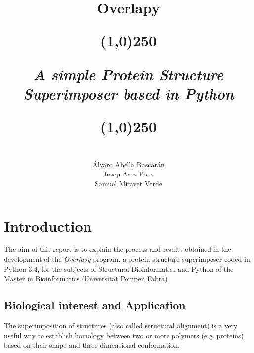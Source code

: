 \documentclass{article}
\begin{document}
\title{\textbf{Overlapy}\\
\begin{center}
\line(1,0){250}
\end{center}
\textit{A simple Protein Structure\\ 
Superimposer based in Python}
\begin{center}
\line(1,0){250}
\end{center}
     \author{
           \\
     \'{A}lvaro Abella Bascar\'{a}n\\
     Josep Arus Pous\\
     Samuel Miravet Verde}
     }
\maketitle

\newpage

\section*{Introduction}
The aim of this report is to explain the process and results obtained in the development of the \textit{Overlapy} program, a protein structure superimposer coded in Python 3.4, for the subjects of Structural Bioinformatics and Python of the Master in Bioinformatics (Universitat Pompeu Fabra)\\

\subsection*{\color{gray}Biological interest and Application}
The superimposition of structures (also called structural alignment) is a very useful way to establish homology between two or more polymers (e.g. proteins) based on their shape and three-dimensional conformation\cite{1}.\\
\end{document}
